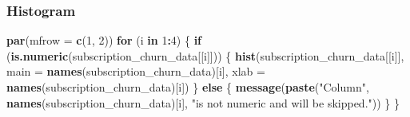 \documentclass[
]{article}
\newenvironment{Shaded}{\begin{snugshade}}{\end{snugshade}}
\newcommand{\AttributeTok}[1]{\textcolor[rgb]{0.13,0.29,0.53}{#1}}
\newcommand{\ControlFlowTok}[1]{\textcolor[rgb]{0.13,0.29,0.53}{\textbf{#1}}}
\newcommand{\DecValTok}[1]{\textcolor[rgb]{0.00,0.00,0.81}{#1}}
\newcommand{\FunctionTok}[1]{\textcolor[rgb]{0.13,0.29,0.53}{\textbf{#1}}}
\newcommand{\NormalTok}[1]{#1}
\newcommand{\SpecialCharTok}[1]{\textcolor[rgb]{0.81,0.36,0.00}{\textbf{#1}}}
\newcommand{\StringTok}[1]{\textcolor[rgb]{0.31,0.60,0.02}{#1}}
\begin{document}
\subsubsection{Histogram}\label{histogram}

\begin{Shaded}
\begin{Highlighting}[]
\FunctionTok{par}\NormalTok{(}\AttributeTok{mfrow =} \FunctionTok{c}\NormalTok{(}\DecValTok{1}\NormalTok{, }\DecValTok{2}\NormalTok{))}
\ControlFlowTok{for}\NormalTok{ (i }\ControlFlowTok{in} \DecValTok{1}\SpecialCharTok{:}\DecValTok{4}\NormalTok{) \{}
  \ControlFlowTok{if}\NormalTok{ (}\FunctionTok{is.numeric}\NormalTok{(subscription\_churn\_data[[i]])) \{}
    \FunctionTok{hist}\NormalTok{(subscription\_churn\_data[[i]],}
         \AttributeTok{main =} \FunctionTok{names}\NormalTok{(subscription\_churn\_data)[i],}
         \AttributeTok{xlab =} \FunctionTok{names}\NormalTok{(subscription\_churn\_data)[i])}
\NormalTok{  \} }\ControlFlowTok{else}\NormalTok{ \{}
    \FunctionTok{message}\NormalTok{(}\FunctionTok{paste}\NormalTok{(}\StringTok{"Column"}\NormalTok{, }\FunctionTok{names}\NormalTok{(subscription\_churn\_data)[i],}
                  \StringTok{"is not numeric and will be skipped."}\NormalTok{))}
\NormalTok{  \}}
\NormalTok{\}}
\end{Highlighting}
\end{Shaded}
\end{document}
